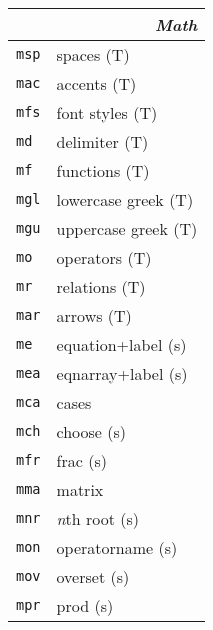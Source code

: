 \documentclass[oneside,10pt,landscape,DIV16]{scrartcl}
\newcommand{\Map}[1] {\textbf{\textasciiacute}\texttt{#1}}
\begin{document}
\begin{multicols}{3}
\begin{center}
\begin{tabular}[]{|p{11mm}|p{60mm}|}
\hline
%
\end{tabular}\\
%
\begin{tabular}[]{|p{11mm}|p{62mm}|}
\hline
\multicolumn{2}{|r|}{\textsl{\textbf{M}ath}}  \\[1.0ex]
\hline  \Map{msp} & spaces                    \hfill (T)\\
\hline  \Map{mac} & accents                   \hfill (T)\\
\hline  \Map{mfs} & font styles               \hfill (T)\\
\hline  \Map{md}  & delimiter                 \hfill (T)\\
\hline  \Map{mf}  & functions                 \hfill (T)\\
\hline  \Map{mgl} & lowercase  greek          \hfill (T)\\
\hline  \Map{mgu} & uppercase greek           \hfill (T)\\
\hline  \Map{mo}  & operators                 \hfill (T)\\
\hline  \Map{mr}  & relations                 \hfill (T)\\
\hline  \Map{mar} & arrows                    \hfill (T)\\
\hline
\hline  \Map{me}  & equation+label            \hfill (s)\\
\hline  \Map{mea} & eqnarray+label            \hfill (s)\\
\hline
\hline  \Map{mca} & cases                     \\
\hline  \Map{mch} & choose                    \hfill (s)\\
\hline  \Map{mfr} & frac                      \hfill (s)\\
\hline  \Map{mma} & matrix                    \\
\hline  \Map{mnr} & \textit{n}th root         \hfill (s)\\
\hline  \Map{mon} & operatorname              \hfill (s)\\
\hline  \Map{mov} & overset                   \hfill (s)\\
\hline  \Map{mpr} & prod                      \hfill (s)\\

\end{tabular}
\end{center}
\end{multicols}
\end{document}
